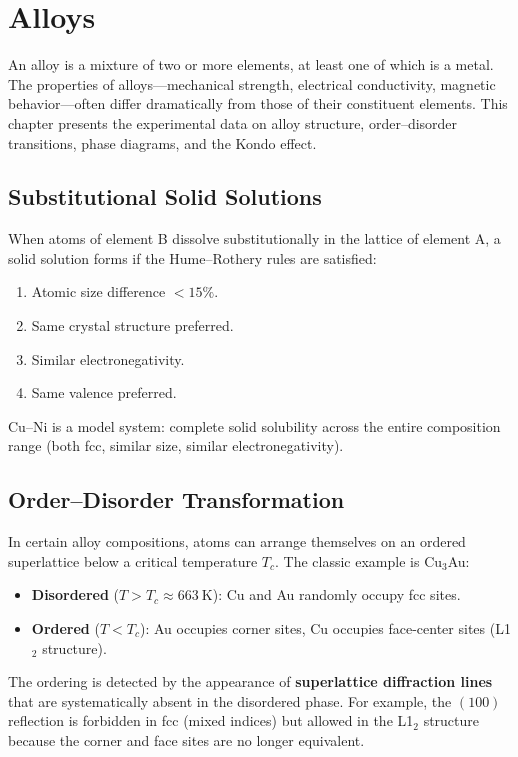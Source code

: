 \chapter{Alloys}

An alloy is a mixture of two or more elements, at least one of which is a metal. The properties of alloys---mechanical strength, electrical conductivity, magnetic behavior---often differ dramatically from those of their constituent elements. This chapter presents the experimental data on alloy structure, order--disorder transitions, phase diagrams, and the Kondo effect.

\section{Substitutional Solid Solutions}

When atoms of element B dissolve substitutionally in the lattice of element A, a solid solution forms if the Hume--Rothery rules are satisfied:
\begin{enumerate}[nosep]
  \item Atomic size difference $< 15\%$.
  \item Same crystal structure preferred.
  \item Similar electronegativity.
  \item Same valence preferred.
\end{enumerate}

Cu--Ni is a model system: complete solid solubility across the entire composition range (both fcc, similar size, similar electronegativity).

\section{Order--Disorder Transformation}

In certain alloy compositions, atoms can arrange themselves on an ordered superlattice below a critical temperature $T_c$. The classic example is Cu$_3$Au:

\begin{itemize}[nosep]
  \item \textbf{Disordered} ($T > T_c \approx \SI{663}{\kelvin}$): Cu and Au randomly occupy fcc sites.
  \item \textbf{Ordered} ($T < T_c$): Au occupies corner sites, Cu occupies face-center sites (L1$_2$ structure).
\end{itemize}

The ordering is detected by the appearance of \textbf{superlattice diffraction lines} that are systematically absent in the disordered phase. For example, the $(100)$ reflection is forbidden in fcc (mixed indices) but allowed in the L1$_2$ structure because the corner and face sites are no longer equivalent.


